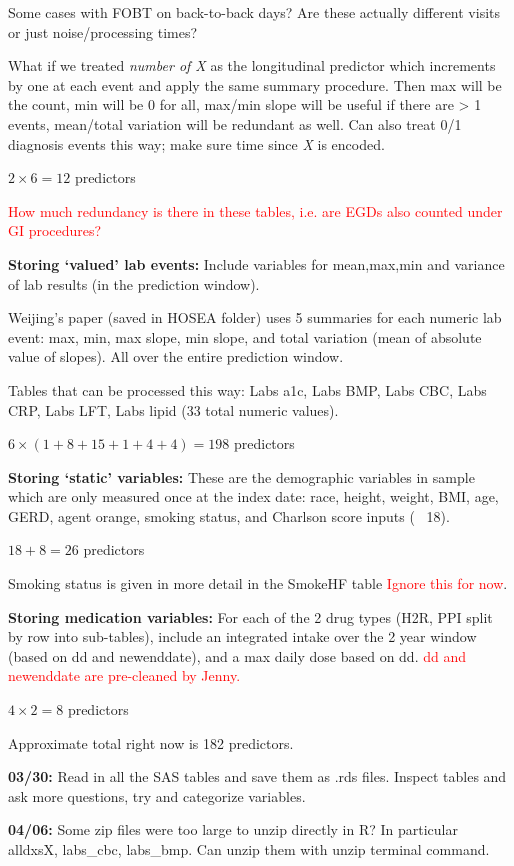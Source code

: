 \documentclass[12pt]{article}
\newcommand{\note}[1]{\textcolor{red}{#1}}
\begin{document}
Some cases with FOBT on back-to-back days? Are these actually different visits or just noise/processing times?

What if we treated {\em number of X} as the longitudinal predictor which increments by one at each event and apply the same summary procedure. Then max will be the count, min will be 0 for all, max/min slope will be useful if there are > 1 events, mean/total variation will be redundant as well. Can also treat 0/1 diagnosis events this way; make sure time since {\em X} is encoded.

$2 \times 6 = 12$ predictors

\note{How much redundancy is there in these tables, i.e. are EGDs also counted under GI procedures?}

{\bf Storing `valued' lab events:} Include variables for mean,max,min and variance of lab results (in the prediction window).

Weijing's paper (saved in HOSEA folder) uses 5 summaries for each numeric lab event: max, min, max slope, min slope, and total variation (mean of absolute value of slopes). All over the entire prediction window.

Tables that can be processed this way: Labs a1c, Labs BMP, Labs CBC, Labs CRP, Labs LFT, Labs lipid (33 total numeric values).

$6 \times (1 + 8 + 15 + 1 + 4 + 4) = 198$ predictors

{\bf Storing `static' variables:} These are the demographic variables in sample which are only measured once at the index date: race, height, weight, BMI, age, GERD, agent orange, smoking status, and Charlson score inputs (~ 18).

$18 + 8 = 26$ predictors

Smoking status is given in more detail in the SmokeHF table \note{Ignore this for now}.

{\bf Storing medication variables:} For each of the 2 drug types (H2R, PPI split by row into sub-tables), include an integrated intake over the 2 year window (based on dd and newenddate), and a max daily dose based on dd. \note{dd and newenddate are pre-cleaned by Jenny.}

$4 \times 2 = 8$ predictors

Approximate total right now is 182 predictors.

{\bf 03/30:} Read in all the SAS tables and save them as .rds files. Inspect tables and ask more questions, try and categorize variables.

{\bf 04/06:} Some zip files were too large to unzip directly in R? In particular alldxsX, labs\_cbc, labs\_bmp. Can unzip them with unzip terminal command.
\end{document}
